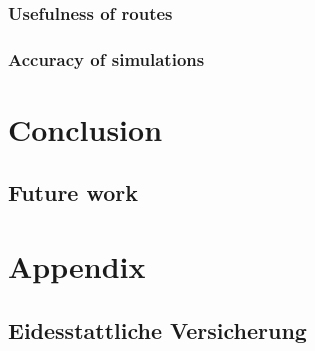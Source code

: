 \documentclass[
	11pt,
	a4paper,
	usegeometry,
	twoside,
	openright,
	toc=chapterentrywithdots
]{scrbook}
\begin{document}
			\subsection{Usefulness of routes}
			
			
			\subsection{Accuracy of simulations}
		
	
	\chapter{Conclusion}
	
		\section{Future work}
		
	\printbibliography

	\printindex
	
	\chapter*{Appendix}
	
		\clearpage
		\section*{Eidesstattliche Versicherung}
		
\end{document}
